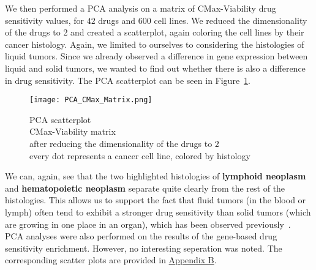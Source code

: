 We then performed a PCA analysis on a matrix of CMax-Viability drug sensitivity values, for $42$ drugs and $600$ cell lines. We reduced the dimensionality of the drugs to 2 and created a scatterplot, again coloring the cell lines by their cancer histology. Again, we limited to ourselves to considering the histologies of liquid tumors. Since we already observed a difference in gene expression between liquid and solid tumors, we wanted to find out whether there is also a difference in drug sensitivity. The PCA scatterplot can be seen in Figure~\ref{fig:pca_cmax}.
\begin{figure}
    \texttt{[image: PCA\_CMax\_Matrix.png]}
    \caption{PCA scatterplot\\CMax-Viability matrix\\after reducing the dimensionality of the drugs to $2$\\every dot represents a cancer cell line, colored by histology}
    \label{fig:pca_cmax}
\end{figure}
We can, again, see that the two highlighted histologies of \textbf{lymphoid neoplasm} and \textbf{hematopoietic neoplasm} separate quite clearly from the rest of the histologies. This allows us to support the fact that fluid tumors (in the blood or lymph) often tend to exhibit a stronger drug sensitivity than solid tumors (which are growing in one place in an organ), which has been observed previously~\cite{fluid_solid_tumors_sensitivity, tissue_specificity_of_in_vitro_drug_sensitivity}.\\
PCA analyses were also performed on the results of the gene-based drug sensitivity enrichment. However, no interesting seperation was noted. The corresponding scatter plots are provided in \hyperref[appendix:pca]{Appendix B}.


